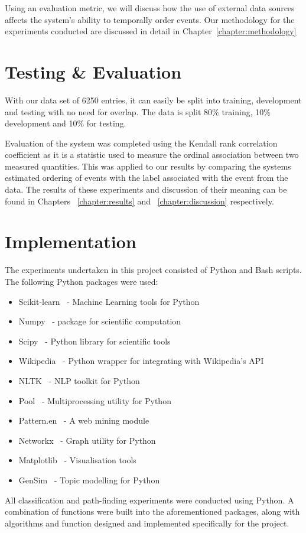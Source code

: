 \documentclass[bsc,frontabs,twoside,singlespacing,parskip,deptreport]{infthesis}     %
\begin{document}
Using an evaluation metric, we will discuss how the use of external data sources affects the system's ability to
temporally order events. Our methodology for the experiments conducted are discussed in detail in Chapter~\ref{chapter:methodology}

\section{Testing \& Evaluation}
With our data set of 6250 entries, it can
easily be split into training, development and testing with no
need for overlap. The data is split 80\% training,
10\% development and 10\% for testing.

Evaluation of the system was completed using the
Kendall rank correlation coefficient as it is a statistic
used to measure the ordinal association between two
measured quantities. This was applied to our results
by comparing the systems estimated ordering of events
with the label associated with the event from the data.
The results of these experiments and discussion of their meaning can be found in Chapters ~\ref{chapter:results} and ~\ref{chapter:discussion} respectively. 

\section{Implementation}
The experiments undertaken in this project consisted of Python and Bash scripts.
The following Python packages were used:
\begin{itemize}
\item Scikit-learn~\cite{scikit-learn} - Machine Learning tools for Python
\item Numpy~\cite{numpy} - package for scientific computation
\item Scipy~\cite{scipy} - Python library for scientific tools
\item Wikipedia~\cite{wikipediaAPI} - Python wrapper for integrating with Wikipedia's API
\item NLTK~\cite{nltk} - NLP toolkit for Python
\item Pool~\cite{pool} - Multiprocessing utility for Python
\item Pattern.en~\cite{pattern} - A web mining module 
\item Networkx~\cite{networkx} - Graph utility for Python
\item Matplotlib~\cite{matplotlib} - Visualisation tools
\item GenSim~\cite{rehurek_lrec} - Topic modelling for Python 
\end{itemize}
All classification and path-finding experiments were conducted using Python. A combination of
functions were built into the aforementioned packages, along with algorithms and function designed and implemented
specifically for the project.
\end{document}
